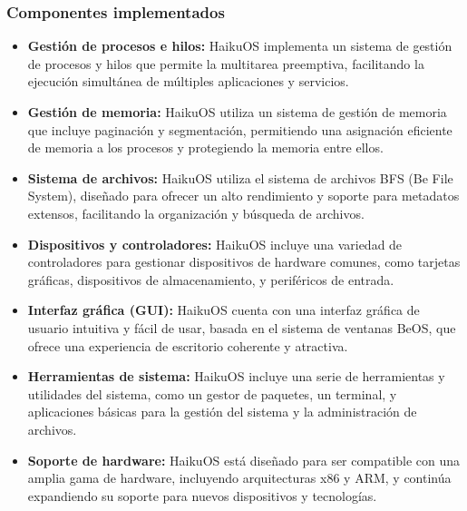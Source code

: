 \subsubsection{Componentes implementados}
\begin{itemize}
	\item \textbf{Gestión de procesos e hilos:} HaikuOS implementa un sistema de gestión de procesos y hilos que permite la multitarea preemptiva, facilitando la ejecución simultánea de múltiples aplicaciones y servicios.

	\item \textbf{Gestión de memoria: } HaikuOS utiliza un sistema de gestión de memoria que incluye paginación y segmentación, permitiendo una asignación eficiente de memoria a los procesos y protegiendo la memoria entre ellos.

	\item \textbf{Sistema de archivos:} HaikuOS utiliza el sistema de archivos BFS (Be File System), diseñado para ofrecer un alto rendimiento y soporte para metadatos extensos, facilitando la organización y búsqueda de archivos.

	\item \textbf{Dispositivos y controladores:} HaikuOS incluye una variedad de controladores para gestionar dispositivos de hardware comunes, como tarjetas gráficas, dispositivos de almacenamiento, y periféricos de entrada.

	\item \textbf{Interfaz gráfica (GUI):} HaikuOS cuenta con una interfaz gráfica de usuario intuitiva y fácil de usar, basada en el sistema de ventanas BeOS, que ofrece una experiencia de escritorio coherente y atractiva.

	\item \textbf{Herramientas de sistema:} HaikuOS incluye una serie de herramientas y utilidades del sistema, como un gestor de paquetes, un terminal, y aplicaciones básicas para la gestión del sistema y la administración de archivos.

	\item \textbf{Soporte de hardware:} HaikuOS está diseñado para ser compatible con una amplia gama de hardware, incluyendo arquitecturas x86 y ARM, y continúa expandiendo su soporte para nuevos dispositivos y tecnologías.
\end{itemize}

